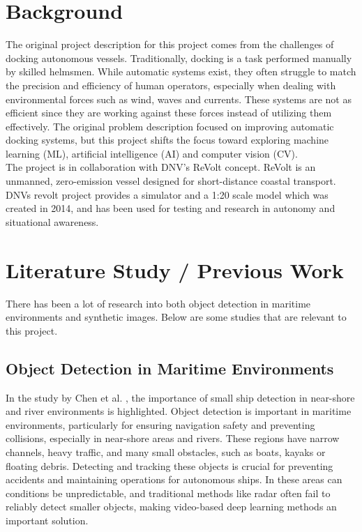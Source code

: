 




\section{Background}

The original project description for this project comes from the challenges of docking autonomous vessels. Traditionally, docking is a task performed manually by skilled helmsmen. While automatic systems exist, they often struggle to match the precision and efficiency of human operators, especially when dealing with environmental forces such as wind, waves and currents. These systems are not as efficient since they are working against these forces instead of utilizing them effectively. The original problem description focused on improving automatic docking systems, but this project shifts the focus toward exploring machine learning (ML), artificial intelligence (AI) and computer vision (CV).\\


\noindent The project is in collaboration with DNV's ReVolt concept. ReVolt is an unmanned, zero-emission vessel designed for short-distance coastal transport. DNVs revolt project provides a simulator and a 1:20 scale model which was created in 2014, and has been used for testing and research in autonomy and situational awareness.

\section{Literature Study / Previous Work}

There has been a lot of research into both object detection in maritime environments and synthetic images. Below are some studies that are relevant to this project.

\subsection{Object Detection in Maritime Environments}

In the study by Chen et al. \cite{safety}, the importance of small ship detection in near-shore and river environments is highlighted. Object detection is important in maritime environments, particularly for ensuring navigation safety and preventing collisions, especially in near-shore areas and rivers. These regions have narrow channels, heavy traffic, and many small obstacles, such as boats, kayaks or floating debris. Detecting and tracking these objects is crucial for preventing accidents and maintaining operations for autonomous ships. In these areas can conditions be unpredictable, and traditional methods like radar often fail to reliably detect smaller objects, making video-based deep learning methods an important solution.\\

